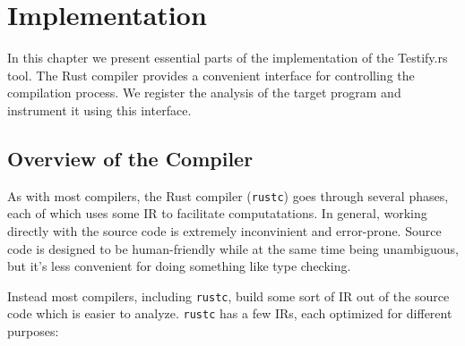 \documentclass{article}
\begin{document}

\section{Implementation}
In this chapter we present essential parts of the implementation of the Testify.rs tool. The Rust compiler provides a convenient interface for controlling the compilation process. We register the analysis of the target program and instrument it using this interface. 

\subsection{Overview of the Compiler}
As with most compilers, the Rust compiler (\lstinline{rustc}) goes through several phases, each of which uses some \ac{IR} to facilitate computatations. In general, working directly with the source code is extremely inconvinient and error-prone. Source code is designed to be human-friendly while at the same time being unambiguous, but it's less convenient for doing something like type checking.

Instead most compilers, including \lstinline{rustc}, build some sort of \ac{IR} out of the source code which is easier to analyze. \lstinline{rustc} has a few \acp{IR}, each optimized for different purposes:
\end{document}
